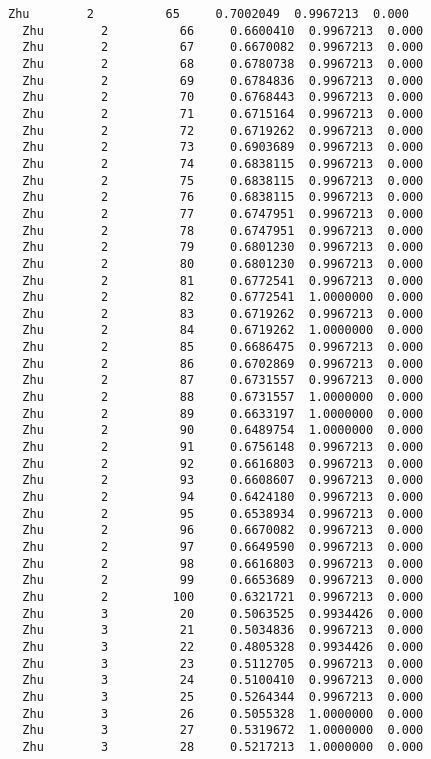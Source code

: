\documentclass[11pt]{article}
\begin{document}
\begin{Verbatim}[commandchars=\\\{\}]
  Zhu        2          65     0.7002049  0.9967213  0.000
  Zhu        2          66     0.6600410  0.9967213  0.000
  Zhu        2          67     0.6670082  0.9967213  0.000
  Zhu        2          68     0.6780738  0.9967213  0.000
  Zhu        2          69     0.6784836  0.9967213  0.000
  Zhu        2          70     0.6768443  0.9967213  0.000
  Zhu        2          71     0.6715164  0.9967213  0.000
  Zhu        2          72     0.6719262  0.9967213  0.000
  Zhu        2          73     0.6903689  0.9967213  0.000
  Zhu        2          74     0.6838115  0.9967213  0.000
  Zhu        2          75     0.6838115  0.9967213  0.000
  Zhu        2          76     0.6838115  0.9967213  0.000
  Zhu        2          77     0.6747951  0.9967213  0.000
  Zhu        2          78     0.6747951  0.9967213  0.000
  Zhu        2          79     0.6801230  0.9967213  0.000
  Zhu        2          80     0.6801230  0.9967213  0.000
  Zhu        2          81     0.6772541  0.9967213  0.000
  Zhu        2          82     0.6772541  1.0000000  0.000
  Zhu        2          83     0.6719262  0.9967213  0.000
  Zhu        2          84     0.6719262  1.0000000  0.000
  Zhu        2          85     0.6686475  0.9967213  0.000
  Zhu        2          86     0.6702869  0.9967213  0.000
  Zhu        2          87     0.6731557  0.9967213  0.000
  Zhu        2          88     0.6731557  1.0000000  0.000
  Zhu        2          89     0.6633197  1.0000000  0.000
  Zhu        2          90     0.6489754  1.0000000  0.000
  Zhu        2          91     0.6756148  0.9967213  0.000
  Zhu        2          92     0.6616803  0.9967213  0.000
  Zhu        2          93     0.6608607  0.9967213  0.000
  Zhu        2          94     0.6424180  0.9967213  0.000
  Zhu        2          95     0.6538934  0.9967213  0.000
  Zhu        2          96     0.6670082  0.9967213  0.000
  Zhu        2          97     0.6649590  0.9967213  0.000
  Zhu        2          98     0.6616803  0.9967213  0.000
  Zhu        2          99     0.6653689  0.9967213  0.000
  Zhu        2         100     0.6321721  0.9967213  0.000
  Zhu        3          20     0.5063525  0.9934426  0.000
  Zhu        3          21     0.5034836  0.9967213  0.000
  Zhu        3          22     0.4805328  0.9934426  0.000
  Zhu        3          23     0.5112705  0.9967213  0.000
  Zhu        3          24     0.5100410  0.9967213  0.000
  Zhu        3          25     0.5264344  0.9967213  0.000
  Zhu        3          26     0.5055328  1.0000000  0.000
  Zhu        3          27     0.5319672  1.0000000  0.000
  Zhu        3          28     0.5217213  1.0000000  0.000

\end{Verbatim}
\end{document}

